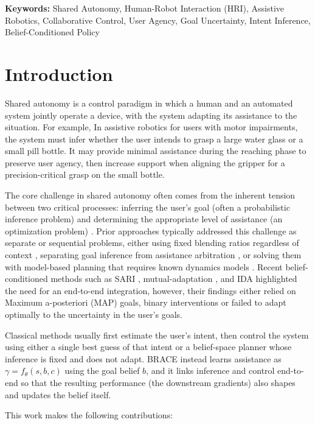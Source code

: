 \documentclass[11pt]{article}
\newcommand{\keywords}[1]{\par\noindent\textbf{Keywords:} #1\par}
\begin{document}
\keywords{Shared Autonomy, Human-Robot Interaction (HRI), Assistive Robotics, Collaborative Control, User Agency, Goal Uncertainty, Intent Inference, Belief-Conditioned Policy}
\section{Introduction}

Shared autonomy is a control paradigm in which a human and an automated system jointly operate a device, with the system adapting its assistance to the situation. For example, In assistive robotics for users with motor impairments, the system must infer whether the user intends to grasp a large water glass or a small pill bottle. It may provide minimal assistance during the reaching phase to preserve user agency, then increase support when aligning the gripper for a precision-critical grasp on the small bottle.

The core challenge in shared autonomy often comes from the inherent tension between two critical processes: inferring the user's goal (often a probabilistic inference problem) and determining the appropriate level of assistance (an optimization problem) \cite{jeon2020}. Prior approaches typically addressed this challenge as separate or sequential problems, either using fixed blending ratios regardless of context \cite{dragan2013policy}, separating goal inference from assistance arbitration \cite{javdani}, or solving them with model-based planning that requires known dynamics models \cite{jarrett}. Recent belief-conditioned methods such as SARI \cite{jonnavittula2022}, mutual-adaptation \cite{nikolaidis}, and IDA \cite{IDA} highlighted the need for an end-to-end integration, however, their findings either relied on Maximum a-posteriori (MAP) goals, binary interventions or failed to adapt optimally to the uncertainty in the user's goals.

Classical methods usually first estimate the user’s intent, then control the system using either a single best guess of that intent or a belief-space planner whose inference is fixed and does not adapt. BRACE instead learns assistance as $\gamma = f_\theta(s, b, c)$ using the goal belief $b$, and it links inference and control end-to-end so that the resulting performance (the downstream gradients) also shapes and updates the belief itself.

This work makes the following contributions:
\end{document}
